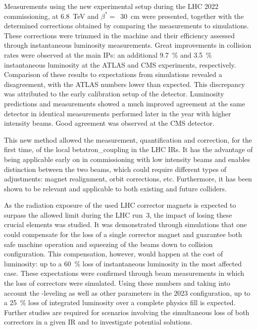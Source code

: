 Measurements using the new experimental setup during the \gls{LHC} \num{2022} commissioning, at \qty{6.8}{\tera\electronvolt} and \(\beta^{\ast} =\)~\qty{30}{\centi\meter} were presented, together with the determined corrections obtained by comparing the measurements to simulations.
These corrections were trimmed in the machine and their efficiency assessed through instantaneous \gls{luminosity} measurements.
Great improvements in collision rates were observed at the main \glspl{IP}: an additional \qty{9.7}{\percent} and \qty{3.5}{\percent} instantaneous luminosity at the \acrshort{ATLAS} and \acrshort{CMS} \glspl{experiment}, respectively.
Comparison of these results to expectations from simulations revealed a disagreement, with the \acrshort{ATLAS} numbers lower than expected.
This discrepancy was attributed to the early calibration setup of the detector.
Luminosity predictions and measurements showed a much improved agreement at the same detector in identical measurements performed later in the year with higher intensity beams.
Good agreement was observed at the \acrshort{CMS} detector.

This new method allowed the measurement, quantification and correction, for the first time, of the local \gls{betatron_coupling} in the \gls{LHC} \glspl{IR}.
It has the advantage of being applicable early on in commissioning with low intensity beams and enables distinction between the two beams, which could require different types of adjustments: magnet realignment, orbit corrections, etc.
Furthermore, it has been shown to be relevant and applicable to both existing and future colliders.

As the radiation exposure of the used \gls{LHC} corrector magnets is expected to surpass the allowed limit during the \gls{LHC} \Gls{run}~\num{3}, the impact of losing these crucial elements was studied.
It was demonstrated through simulations that one could compensate for the loss of a single corrector magnet and guarantee both safe machine operation and squeezing of the beams down to collision configuration.
This compensation, however, would happen at the cost of luminosity: up to a \qty{60}{\percent} loss of instantaneous luminosity in the most affected case.
These expectations were confirmed through beam measurements in which the loss of correctors were simulated.
Using these numbers and taking into account the -leveling as well as other parameters in the \num{2023} configuration, up to a \qty{25}{\percent} loss of integrated luminosity over a complete physics fill is expected.
Further studies are required for scenarios involving the simultaneous loss of both correctors in a given \gls{IR} and to investigate potential solutions.
\break

